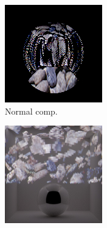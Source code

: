 \begin{figure}[]
    \centering    
    \begin{subfigure}{\textwidth}
        \centering
        \begin{subfigure}{0.32\textwidth}
            \centering
            \includegraphics[width=\textwidth]{images/04-experiment03/dof/normal.jpg}
            \caption{Normal comp.}
            \label{fig:ex03-dof-normal_im}
        \end{subfigure}
        \hfill
        \begin{subfigure}{0.32\textwidth}
            \centering
            \includegraphics[width=\textwidth]{images/04-experiment03/dof/normal_on_normal.jpg}

\end{subfigure}
\end{subfigure}
\end{figure}
